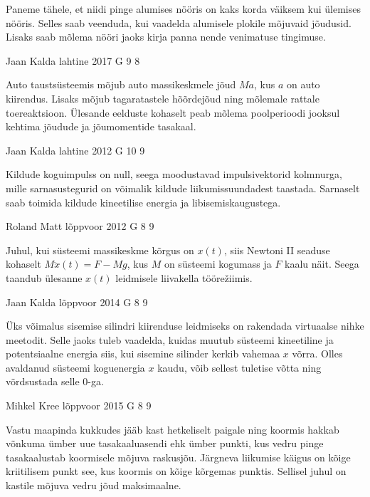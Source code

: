\documentclass[11pt]{article}
\begin{document}
{{\ifHint
Paneme tähele, et niidi pinge alumises nööris on kaks korda väiksem kui ülemises nööris. Selles saab veenduda, kui vaadelda alumisele plokile mõjuvaid jõudusid. Lisaks saab mõlema nööri jaoks kirja panna nende venimatuse tingimuse.
\fi
}

{Jaan Kalda} %
{lahtine} %
{2017} %
{G 9} %
{8} %
{

\ifHint
Auto taustsüsteemis mõjub auto massikeskmele jõud $Ma$, kus $a$ on auto kiirendus. Lisaks mõjub tagaratastele hõõrdejõud ning mõlemale rattale toereaktsioon. Ülesande eelduste kohaselt peab mõlema poolperioodi jooksul kehtima jõudude ja jõumomentide tasakaal.
\fi
}

{Jaan Kalda} %
{lahtine} %
{2012} %
{G 10} %
{9} %
{

\ifHint
Kildude koguimpulss on null, seega moodustavad impulsivektorid kolmnurga, mille sarnasustegurid on võimalik kildude liikumissuundadest taastada. Sarnaselt saab toimida kildude kineetilise energia ja libisemiskaugustega.
\fi
}

{Roland Matt} %
{lõppvoor} %
{2012} %
{G 8} %
{9} %
{

\ifHint
Juhul, kui süsteemi massikeskme kõrgus on $x(t)$, siis Newtoni II seaduse kohaselt $M\ddot{x}(t) = F - Mg$, kus $M$ on süsteemi kogumass ja $F$ kaalu näit. Seega taandub ülesanne $x(t)$ leidmisele liivakella töörežiimis.
\fi
}

{Jaan Kalda} %
{lõppvoor} %
{2014} %
{G 8} %
{9} %
{

\ifHint
Üks võimalus sisemise silindri kiirenduse leidmiseks on rakendada virtuaalse nihke meetodit. Selle jaoks tuleb vaadelda, kuidas muutub süsteemi kineetiline ja potentsiaalne energia siis, kui sisemine silinder kerkib vahemaa $x$ võrra. Olles avaldanud süsteemi koguenergia $x$ kaudu, võib sellest tuletise võtta ning võrdsustada selle \num{0}-ga.
\fi
}

{Mihkel Kree} %
{lõppvoor} %
{2015} %
{G 8} %
{9} %
{

\ifHint
Vastu maapinda kukkudes jääb kast hetkeliselt paigale ning koormis hakkab võnkuma ümber uue tasakaaluasendi ehk ümber punkti, kus vedru pinge tasakaalustab koormisele mõjuva raskusjõu. Järgneva liikumise käigus on kõige kriitilisem punkt see, kus koormis on kõige kõrgemas punktis. Sellisel juhul on kastile mõjuva vedru jõud maksimaalne.
\fi
}

}
\end{document}

